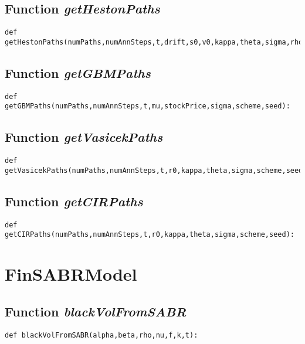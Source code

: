 \documentclass[twoside,11pt]{book}
\begin{document}
\subsection{Function {\it getHestonPaths}}


\begin{lstlisting}
def getHestonPaths(numPaths,numAnnSteps,t,drift,s0,v0,kappa,theta,sigma,rho,scheme,seed):
\end{lstlisting}

\subsection{Function {\it getGBMPaths}}


\begin{lstlisting}
def getGBMPaths(numPaths,numAnnSteps,t,mu,stockPrice,sigma,scheme,seed):
\end{lstlisting}

\subsection{Function {\it getVasicekPaths}}


\begin{lstlisting}
def getVasicekPaths(numPaths,numAnnSteps,t,r0,kappa,theta,sigma,scheme,seed):
\end{lstlisting}

\subsection{Function {\it getCIRPaths}}


\begin{lstlisting}
def getCIRPaths(numPaths,numAnnSteps,t,r0,kappa,theta,sigma,scheme,seed):
\end{lstlisting}

\newpage
\section{FinSABRModel}

\subsection{Function {\it blackVolFromSABR}}


\begin{lstlisting}
def blackVolFromSABR(alpha,beta,rho,nu,f,k,t): 
\end{lstlisting}
\end{document}
